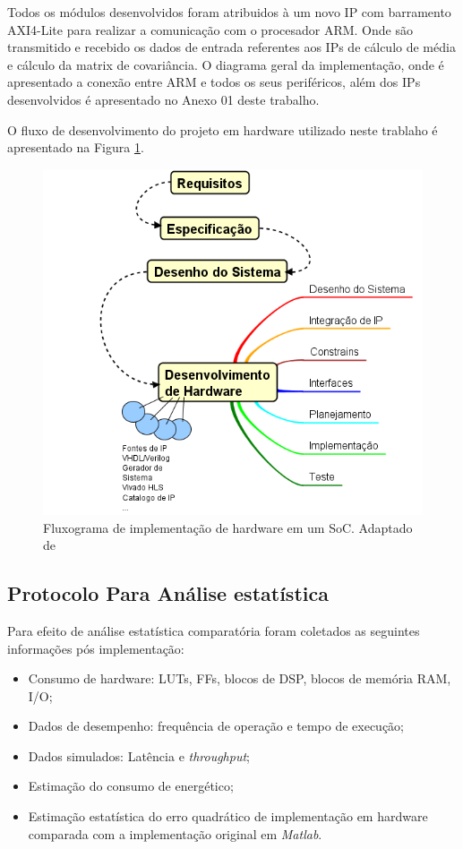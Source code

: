 Todos os módulos desenvolvidos foram atribuidos à um novo IP com barramento AXI4-Lite para realizar a comunicação com o procesador ARM. Onde são transmitido e recebido os dados de entrada referentes aos IPs de cálculo de média e cálculo da matrix de covariância. O diagrama geral da implementação, onde é apresentado a conexão entre ARM e todos os seus periféricos, além dos IPs desenvolvidos é apresentado no Anexo 01 deste trabalho.

O fluxo de desenvolvimento do projeto em hardware utilizado neste trablaho é apresentado na Figura \ref{diagram_hardware}.

\begin{figure}[h]
  \centering
  \includegraphics[keepaspectratio=true,scale=1.0]{figuras/fluxograma_hardware.PNG}
  \caption{Fluxograma de implementação de hardware em um SoC. Adaptado de \cite{zynqBook}}
  \label{diagram_hardware}
\end{figure}

\subsection{Protocolo Para Análise estatística}
Para efeito de análise estatística comparatória foram coletados as seguintes informações pós implementação:

\begin{itemize}[noitemsep]
	\item Consumo de hardware: LUTs, FFs, blocos de DSP, blocos de memória RAM, I/O;
	\item Dados de desempenho: frequência de operação e tempo de execução;
	\item Dados simulados: Latência e \textit{throughput};
	\item Estimação do consumo de energético;
	\item Estimação estatística do erro quadrático de implementação em hardware comparada com a implementação original em \textit{Matlab}.
\end{itemize}

